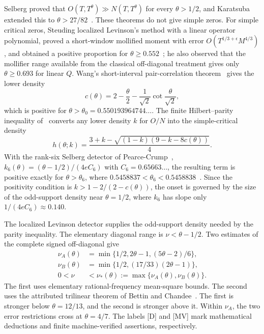 \documentclass[11pt]{article}
\theoremstyle{remark}
\begin{document}
Selberg proved that $O(T,T^\theta)\gg N(T,T^\theta)$ for every
$\theta>1/2$, and Karatsuba extended this to $\theta>27/82$~\cite{Karatsuba}.
These theorems do not give simple zeros. For simple critical zeros, Steuding
localized Levinson's method with a linear operator polynomial, proved a
short-window mollified moment with error $O(T^{1/3+\epsilon}M^{4/3})$, and
obtained a positive proportion for $\theta\ge0.552$~\cite{Steuding,SteudingThesis};
he also observed that the mollifier range available from the classical
off-diagonal treatment gives only $\theta\ge0.693$ for linear $Q$. Wang's short-interval
pair-correlation theorem~\cite{WangShort} gives the lower density
\begin{equation}\label{eq:wangc}
 c(\theta)=2-\frac\theta2-\frac1{\sqrt2}\cot\frac{\theta}{\sqrt2},
\end{equation}
which is positive for $\theta>\theta_0=0.550193964744\ldots$. The finite
Hilbert--parity inequality of~\cite[Proposition 2.5]{CAOSShort} converts any
lower density $k$ for $O/N$ into the simple-critical density
\begin{equation}\label{eq:h}
 h(\theta;k)=\frac{3+k-\sqrt{(1-k)(9-k-8c(\theta))}}4 .
\end{equation}
With the rank-six Selberg detector of Pearce-Crump~\cite{PearceCrump},
$k_6(\theta)=(\theta-1/2)/(4eC_6)$ with $C_6=0.65663\ldots$, the resulting
term is positive exactly for $\theta>\theta_6$, where
$0.5458837<\theta_6<0.5458838$~\cite[Theorem 1.2]{CAOSShort}. Since the
positivity condition is $k>1-2/(2-c(\theta))$, the onset is governed by the
size of the odd-support density near $\theta=1/2$, where $k_6$ has slope only
$1/(4eC_6)\approx0.140$.

The localized Levinson detector supplies the odd-support density needed
by the parity inequality. The elementary diagonal range is
$\nu<\theta-1/2$. Two estimates of the complete signed off-diagonal give
\begin{align}
 \nu_A(\theta)&=\min\{1/2,2\theta-1,(5\theta-2)/6\},\label{eq:rangeA}\\
 \nu_B(\theta)&=\min\{1/2,(17/33)(2\theta-1)\},\label{eq:rangeB}\\
 0<\nu&<\nu_*(\theta):=\max\{\nu_A(\theta),\nu_B(\theta)\}.\label{eq:range}
\end{align}
The first uses elementary rational-frequency mean-square bounds. The
second uses the attributed trilinear theorem of Bettin and
Chandee~\cite{BC}. The first is stronger below $\theta=12/13$, and the
second is stronger above it. Within $\nu_A$, the two error restrictions
cross at $\theta=4/7$. The labels [D] and [MV] mark mathematical deductions
and finite machine-verified assertions, respectively.
\end{document}
